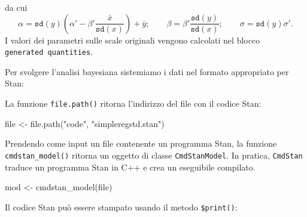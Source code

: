 \documentclass[
  10pt,
  italian,
  a4paper,
  extrafontsizes,onecolumn,openright
  ]{memoir}
\newenvironment{Shaded}{\begin{snugshade}}{\end{snugshade}}
\newcommand{\AttributeTok}[1]{\textcolor[rgb]{0.77,0.63,0.00}{#1}}
\newcommand{\FunctionTok}[1]{\textcolor[rgb]{0.00,0.00,0.00}{#1}}
\newcommand{\NormalTok}[1]{#1}
\newcommand{\OtherTok}[1]{\textcolor[rgb]{0.56,0.35,0.01}{#1}}
\newcommand{\SpecialCharTok}[1]{\textcolor[rgb]{0.00,0.00,0.00}{#1}}
\newcommand{\StringTok}[1]{\textcolor[rgb]{0.31,0.60,0.02}{#1}}
\begin{document}
\noindent
da cui
\[
\alpha
=
\texttt{sd}(y)
      \left(
          \alpha'
          - \beta' \frac{\bar{x}}{\texttt{sd}(x)}
      \right)
  + \bar{y};
\qquad
\beta = \beta' \frac{\texttt{sd}(y)}{\texttt{sd}(x)};
\qquad
\sigma = \texttt{sd}(y) \sigma'.
\]
\noindent
I valori dei parametri sulle scale originali vengono calcolati nel blocco \texttt{generated\ quantities}.

Per svolgere l'analisi bayesiana sistemiamo i dati nel formato appropriato per Stan:

\begin{Shaded}
\end{Shaded}

\noindent
La funzione \texttt{file.path()} ritorna l'indirizzo del file con il codice Stan:

\begin{Shaded}
\begin{Highlighting}[]
\NormalTok{file }\OtherTok{\textless{}{-}} \FunctionTok{file.path}\NormalTok{(}\StringTok{"code"}\NormalTok{, }\StringTok{"simpleregstd.stan"}\NormalTok{)}
\end{Highlighting}
\end{Shaded}

\noindent
Prendendo come input un file contenente un programma Stan, la funzione \texttt{cmdstan\_model()} ritorna un oggetto di classe \texttt{CmdStanModel}. In pratica, \texttt{CmdStan} traduce un programma Stan in C++ e crea un eseguibile compilato.

\begin{Shaded}
\begin{Highlighting}[]
\NormalTok{mod }\OtherTok{\textless{}{-}} \FunctionTok{cmdstan\_model}\NormalTok{(file)}
\end{Highlighting}
\end{Shaded}

\noindent
Il codice Stan può essere stampato usando il metodo \texttt{\$print()}:
\end{document}
